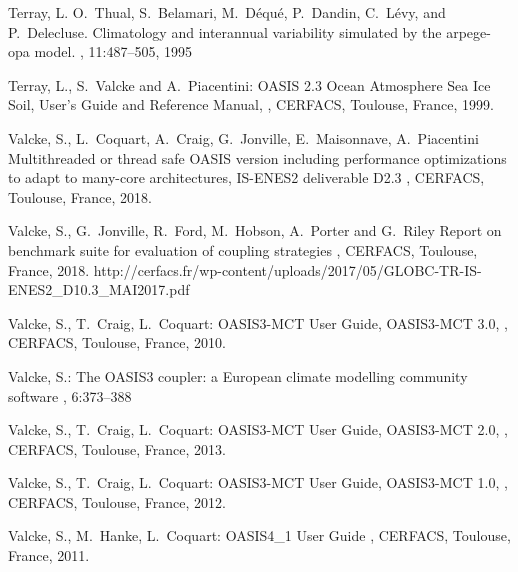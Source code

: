 \begin{thebibliography}{10}
Terray, L. O.~Thual, S.~Belamari, M.~D\'equ\'e, P.~Dandin, C.~L\'evy, and
P.~Delecluse. 
\newblock Climatology and interannual variability simulated by the arpege-opa
model. 
, 11:487--505, 1995

Terray, L., S.~Valcke and A.~Piacentini:
\newblock OASIS 2.3 Ocean Atmosphere Sea Ice Soil, User's Guide and
Reference Manual,
, 
\newblock CERFACS, Toulouse, France, 1999.

Valcke, S., L.~Coquart, A.~Craig, G.~Jonville, E.~Maisonnave, A.~Piacentini
\newblock Multithreaded or thread safe OASIS version including performance optimizations to adapt to many-core architectures, IS-ENES2 deliverable D2.3
,  
\newblock CERFACS, Toulouse, France, 2018.

Valcke, S., G.~Jonville, R.~Ford, M.~Hobson, A.~Porter and G.~Riley
\newblock Report on benchmark suite for evaluation of coupling strategies
,  
\newblock CERFACS, Toulouse, France, 2018.
\newblock http://cerfacs.fr/wp-content/uploads/2017/05/GLOBC-TR-IS-ENES2\_D10.3\_MAI2017.pdf

Valcke, S., T.~Craig, L.~Coquart: 
\newblock OASIS3-MCT User Guide, OASIS3-MCT 3.0, 
,  
\newblock CERFACS, Toulouse, France, 2010.

Valcke, S.: 
\newblock The OASIS3 coupler: a European climate modelling community software
, 6:373--388

Valcke, S., T.~Craig, L.~Coquart: 
\newblock OASIS3-MCT User Guide, OASIS3-MCT 2.0, 
,  
\newblock CERFACS, Toulouse, France, 2013.

Valcke, S., T.~Craig, L.~Coquart: 
\newblock OASIS3-MCT User Guide, OASIS3-MCT 1.0, 
,  
\newblock CERFACS, Toulouse, France, 2012.

Valcke, S., M.~Hanke, L.~Coquart:
\newblock OASIS4\_1 User Guide
, 
\newblock CERFACS, Toulouse, France, 2011. 


\end{thebibliography}
